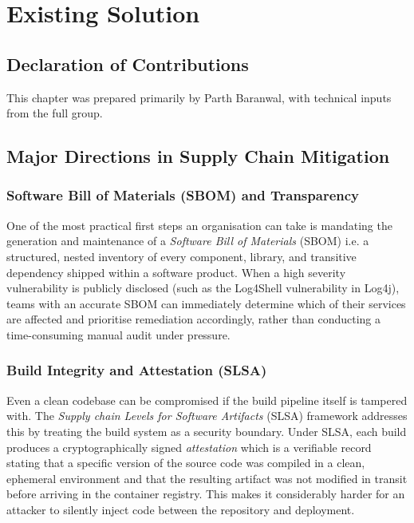 \chapter{Existing Solution}
\label{ch:existing-solution}

\section*{Declaration of Contributions}
This chapter was prepared primarily by Parth Baranwal,
with technical inputs from the full group.

\section{Major Directions in Supply Chain Mitigation}
 
\subsection{Software Bill of Materials (SBOM) and Transparency}
 
One of the most practical first steps an organisation can take is mandating the generation and maintenance of a \textit{Software Bill of Materials} (SBOM) i.e. a structured, nested inventory of every component, library, and transitive dependency shipped within a software product. When a high severity vulnerability is publicly disclosed (such as the Log4Shell vulnerability in Log4j), teams with an accurate SBOM can immediately determine which of their services are affected and prioritise remediation accordingly, rather than conducting a time-consuming manual audit under pressure.
 
\subsection{Build Integrity and Attestation (SLSA)}
 
Even a clean codebase can be compromised if the build pipeline itself is tampered with. The \textit{Supply chain Levels for Software Artifacts} (SLSA) framework addresses this by treating the build system as a security boundary. Under SLSA, each build produces a cryptographically signed \textit{attestation} which is a verifiable record stating that a specific version of the source code was compiled in a clean, ephemeral environment and that the resulting artifact was not modified in transit before arriving in the container registry. This makes it considerably harder for an attacker to silently inject code between the repository and deployment.
 
